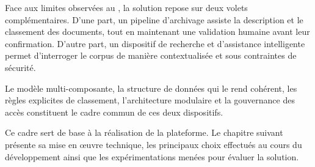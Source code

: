 Face aux limites observées au \nomMinistere{}, la solution repose sur deux volets complémentaires. D'une part, un pipeline d'archivage assiste la description et le classement des documents, tout en maintenant une validation humaine avant leur confirmation. D'autre part, un dispositif de recherche et d'assistance intelligente permet d'interroger le corpus de manière contextualisée et sous contraintes de sécurité.

Le modèle multi-composante, la structure de données qui le rend cohérent, les règles explicites de classement, l'architecture modulaire et la gouvernance des accès constituent le cadre commun de ces deux dispositifs.

Ce cadre sert de base à la réalisation de la plateforme. Le chapitre suivant présente sa mise en œuvre technique, les principaux choix effectués au cours du développement ainsi que les expérimentations menées pour évaluer la solution.
